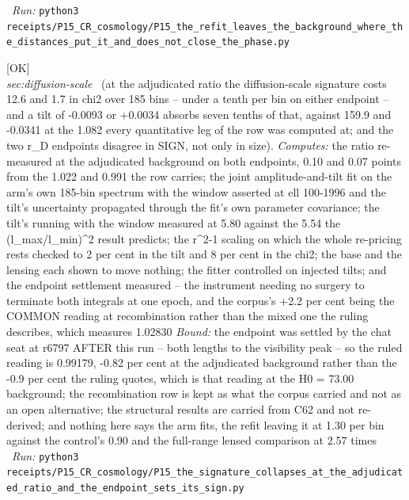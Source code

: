 \begin{description}
\ \emph{Run:} \texttt{python3 receipts/P15\_CR\_cosmology/P15\_the\_refit\_leaves\_the\_background\_where\_the\_distances\_put\_it\_and\_does\_not\_close\_the\_phase.py}
\item[\rcptlabel{P15_the_signature_collapses_at_the_adjudicated_ratio_and_the_endpoint_sets_its_sign}{P15R168}\textbf{P15R168}\quad\texttt{P15\_the\_signature\_collapses\_at\_the\_adjudicated\_ratio\_and\_the\_endpoint\_sets\_its\_sign}]\hfill\textsf{[OK]}\\
\textit{sec:diffusion-scale} \ (at the adjudicated ratio the diffusion-scale signature costs 12.6 and 1.7 in chi2 over 185 bins -- under a tenth per bin on either endpoint -- and a tilt of -0.0093 or +0.0034 absorbs seven tenths of that, against 159.9 and -0.0341 at the 1.082 every quantitative leg of the row was computed at; and the two r\_D endpoints disagree in SIGN, not only in size). 
\emph{Computes:} the ratio re-measured at the adjudicated background on both endpoints, 0.10 and 0.07 points from the 1.022 and 0.991 the row carries; the joint amplitude-and-tilt fit on the arm's own 185-bin spectrum with the window asserted at ell 100-1996 and the tilt's uncertainty propagated through the fit's own parameter covariance; the tilt's running with the window measured at 5.80 against the 5.54 the (l\_max/l\_min)\textasciicircum{}2 result predicts; the r\textasciicircum{}2-1 scaling on which the whole re-pricing rests checked to 2 per cent in the tilt and 8 per cent in the chi2; the base and the lensing each shown to move nothing; the fitter controlled on injected tilts; and the endpoint settlement measured -- the instrument needing no surgery to terminate both integrals at one epoch, and the corpus's +2.2 per cent being the COMMON reading at recombination rather than the mixed one the ruling describes, which measures 1.02830
 \emph{Bound:} the endpoint was settled by the chat seat at r6797 AFTER this run -- both lengths to the visibility peak -- so the ruled reading is 0.99179, -0.82 per cent at the adjudicated background rather than the -0.9 per cent the ruling quotes, which is that reading at the H0 = 73.00 background; the recombination row is kept as what the corpus carried and not as an open alternative; the structural results are carried from C62 and not re-derived; and nothing here says the arm fits, the refit leaving it at 1.30 per bin against the control's 0.90 and the full-range lensed comparison at 2.57 times
\ \emph{Run:} \texttt{python3 receipts/P15\_CR\_cosmology/P15\_the\_signature\_collapses\_at\_the\_adjudicated\_ratio\_and\_the\_endpoint\_sets\_its\_sign.py}

\end{description}
